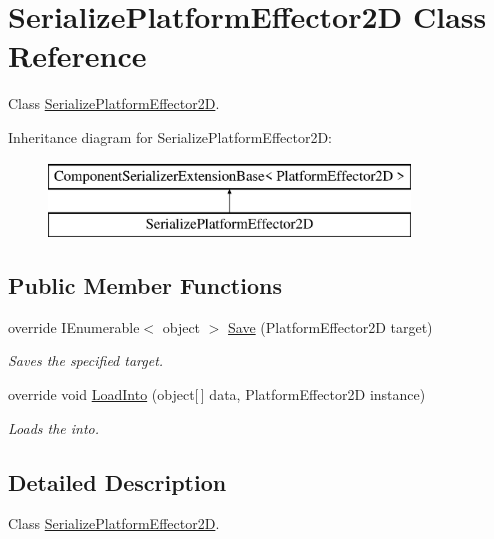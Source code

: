 \hypertarget{class_serialize_platform_effector2_d}{}\section{Serialize\+Platform\+Effector2D Class Reference}
\label{class_serialize_platform_effector2_d}


Class \hyperlink{class_serialize_platform_effector2_d}{Serialize\+Platform\+Effector2D}.  


Inheritance diagram for Serialize\+Platform\+Effector2D\+:\begin{figure}[H]
\begin{center}
\leavevmode
\includegraphics[height=2.000000cm]{class_serialize_platform_effector2_d}
\end{center}
\end{figure}
\subsection*{Public Member Functions}
\begin{DoxyCompactItemize}
\item 
override I\+Enumerable$<$ object $>$ \hyperlink{class_serialize_platform_effector2_d_a3cc7f3792e67702b2f2e272104353d7e}{Save} (Platform\+Effector2D target)
\begin{DoxyCompactList}\small\item\em Saves the specified target. \end{DoxyCompactList}\item 
override void \hyperlink{class_serialize_platform_effector2_d_a795aec6c3fcd799843a26c4d8f1520c8}{Load\+Into} (object\mbox{[}$\,$\mbox{]} data, Platform\+Effector2D instance)
\begin{DoxyCompactList}\small\item\em Loads the into. \end{DoxyCompactList}\end{DoxyCompactItemize}


\subsection{Detailed Description}
Class \hyperlink{class_serialize_platform_effector2_d}{Serialize\+Platform\+Effector2D}. 



